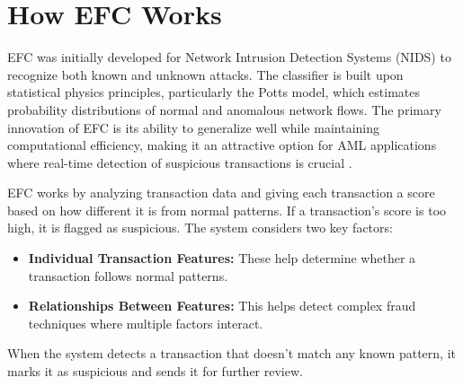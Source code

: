 \section{How EFC Works}
EFC was initially developed for Network Intrusion Detection Systems (NIDS) to
recognize both known and unknown attacks. The classifier is built upon statistical
physics principles, particularly the Potts model, which estimates probability
distributions of normal and anomalous network flows. The primary innovation of
EFC is its ability to generalize well while maintaining computational efficiency,
making it an attractive option for AML applications where real-time detection of
suspicious transactions is crucial \cite{souza2022}.

EFC works by analyzing transaction data and giving each transaction a score based
on how different it is from normal patterns. If a transaction's score is too high,
it is flagged as suspicious. The system considers two key factors:

\begin{itemize}
    \item \textbf{Individual Transaction Features:} These help determine whether
    a transaction follows normal patterns.
    \item \textbf{Relationships Between Features:} This helps detect complex fraud
    techniques where multiple factors interact.
\end{itemize}

When the system detects a transaction that doesn't match any known pattern, it
marks it as suspicious and sends it for further review.

